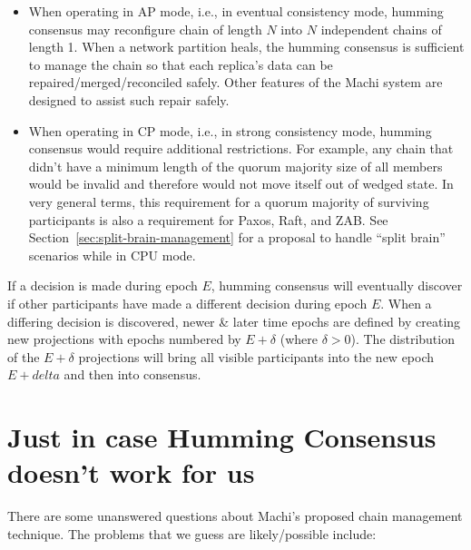\documentclass[preprint,10pt]{sigplanconf}
\begin{document}
\begin{itemize}

\item When operating in AP mode, i.e., in eventual consistency mode, humming
consensus may reconfigure chain of length $N$ into $N$
independent chains of length 1.  When a network partition heals, the
humming consensus is sufficient to manage the chain so that each
replica's data can be repaired/merged/reconciled safely.
Other features of the Machi system are designed to assist such
repair safely.

\item When operating in CP mode, i.e., in strong consistency mode, humming
consensus would require additional restrictions.  For example, any
chain that didn't have a minimum length of the quorum majority size of
all members would be invalid and therefore would not move itself out
of wedged state.  In very general terms, this requirement for a quorum
majority of surviving participants is also a requirement for Paxos,
Raft, and ZAB. See Section~\ref{sec:split-brain-management} for a
proposal to handle ``split brain'' scenarios while in CPU mode.

\end{itemize}

If a decision is made during epoch $E$, humming consensus will
eventually discover if other participants have made a different
decision during epoch $E$.  When a differing decision is discovered,
newer \& later time epochs are defined by creating new projections
with epochs numbered by $E+\delta$ (where $\delta > 0$).
The distribution of the $E+\delta$ projections will bring all visible
participants into the new epoch $E+delta$ and then into consensus.

\section{Just in case Humming Consensus doesn't work for us}

There are some unanswered questions about Machi's proposed chain
management technique.  The problems that we guess are likely/possible
include:
\end{document}
